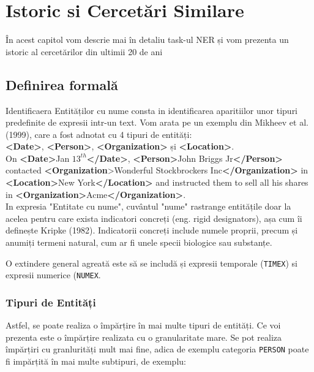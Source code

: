 \chapter{Istoric si Cercetări Similare}
\label{chapter:history}

În acest capitol vom descrie mai în detaliu task-ul NER și vom prezenta un istoric al cercetărilor din ultimii 20 de ani

\section{Definirea formală}

Identificaera Entităților cu nume consta in identificarea aparitiilor unor tipuri predefinite de expresii intr-un text. Vom arata pe un exemplu din Mikheev et al. (1999), care a fost adnotat cu 4 tipuri de entități:\\

\textbf{<Date>}, \textbf{<Person>}, \textbf{<Organization>} și \textbf{<Location>}.\\


On \textbf{<Date>}Jan $13^{th}$\textbf{</Date>}, \textbf{<Person>}John Briggs Jr\textbf{</Person>} contacted
\textbf{<Organization}>Wonderful Stockbrockers Inc\textbf{</Organization>} in\textbf{ <Location>}New
York\textbf{</Location>} and instructed them to sell all his shares in
\textbf{<Organization>}Acme\textbf{</Organization>}.\\

In expresia "Entitate cu nume", cuvântul "nume" rastrange entitățile doar la acelea pentru care exista indicatori concreți (eng. rigid designators), așa cum îi definește Kripke (1982). Indicatorii concreți include numele proprii, precum și anumiți termeni natural, cum ar fi unele specii biologice sau substanțe.

O extindere general agreată este să se includă și expresii temporale (\texttt{TIMEX}) si expresii numerice (\texttt{NUMEX}.

\subsection{Tipuri de Entități}

Astfel, se poate realiza o împărțire în mai multe tipuri de entități. Ce voi prezenta este o împărțire realizata cu o granularitate mare. Se pot realiza împărțiri cu granlurități mult mai fine, adica de exemplu categoria \texttt{PERSON} poate fi impărțită în mai multe subtipuri, de exemplu:

